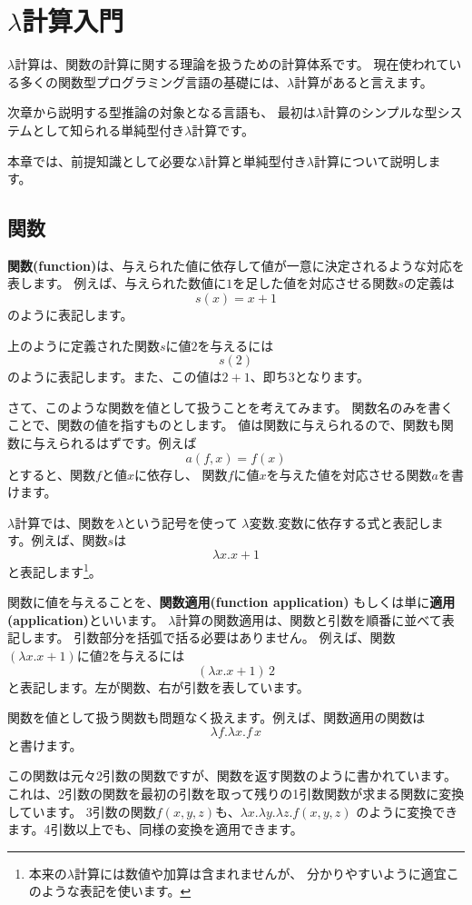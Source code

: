 
\chapter{$\lambda$計算入門}

$\lambda$計算は、関数の計算に関する理論を扱うための計算体系です。
現在使われている多くの関数型プログラミング言語の基礎には、$\lambda$計算があると言えます。

次章から説明する型推論の対象となる言語も、
最初は$\lambda$計算のシンプルな型システムとして知られる単純型付き$\lambda$計算です。

本章では、前提知識として必要な$\lambda$計算と単純型付き$\lambda$計算について説明します。

\section{関数}

\textbf{関数(function)}は、与えられた値に依存して値が一意に決定されるような対応を表します。
例えば、与えられた数値に$1$を足した値を対応させる関数$s$の定義は
\[
  s(x) = x+1
\]
のように表記します。

上のように定義された関数$s$に値$2$を与えるには
\[
  s(2)
\]
のように表記します。また、この値は$2+1$、即ち$3$となります。

さて、このような関数を値として扱うことを考えてみます。
関数名のみを書くことで、関数の値を指すものとします。
値は関数に与えられるので、関数も関数に与えられるはずです。例えば
\[
  a(f, x) = f(x)
\]
とすると、関数$f$と値$x$に依存し、
関数$f$に値$x$を与えた値を対応させる関数$a$を書けます。

$\lambda$計算では、関数を$\lambda$という記号を使って
$\lambda \text{変数} . \text{変数に依存する式}$と表記します。例えば、関数$s$は
\[
  \lambda x . x + 1
\]
と表記します\footnote{本来の$\lambda$計算には数値や加算は含まれませんが、
分かりやすいように適宜このような表記を使います。}。

関数に値を与えることを、\textbf{関数適用(function application)}
もしくは単に\textbf{適用(application)}といいます。
$\lambda$計算の関数適用は、関数と引数を順番に並べて表記します。
引数部分を括弧で括る必要はありません。
例えば、関数$(\lambda x . x + 1)$に値$2$を与えるには
\[
  (\lambda x . x + 1) \, 2
\]
と表記します。左が関数、右が引数を表しています。

関数を値として扱う関数も問題なく扱えます。例えば、関数適用の関数は
\[
  \lambda f . \lambda x . f \, x
\]
と書けます。

この関数は元々2引数の関数ですが、関数を返す関数のように書かれています。
これは、2引数の関数を最初の引数を取って残りの1引数関数が求まる関数に変換しています。
3引数の関数$f(x, y, z)$も、$\lambda x . \lambda y . \lambda z . f(x, y, z)$
のように変換できます。4引数以上でも、同様の変換を適用できます。

